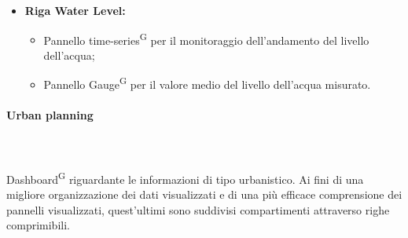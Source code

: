 \documentclass[8pt]{article}
\newcommand{\glossterm}[1]{#1\textsuperscript{G}} %
\newcommand{\subsubsubsection}[1]{\paragraph{#1}\mbox{}\\\\}
\begin{document}
\begin{itemize}
\begin{itemize}
        \item Pannello \glossterm{time-series} per il monitoraggio dell'andamento della quantità di PM10 nell'aria;
        \item Pannello \glossterm{time-series} per il monitoraggio dell'andamento della quantità di O3 nell'aria;
        \item Pannello \glossterm{time-series} per il monitoraggio dell'andamento della quantità di NO2 nell'aria;
        \item Pannello \glossterm{Gauge} per il valore medio di PM2.5 misurato;
        \item Pannello \glossterm{Gauge} per il valore medio di PM10 misurato;
        \item Pannello \glossterm{Gauge} per il valore medio di O3 misurato;
        \item Pannello \glossterm{Gauge} per il valore medio di NO2 misurato.
    \end{itemize}
    \item \textbf{Riga Water Level:}
    \begin{itemize}
        \item Pannello \glossterm{time-series} per il monitoraggio dell'andamento del livello dell'acqua;
        \item Pannello \glossterm{Gauge} per il valore medio del livello dell'acqua misurato. 
    \end{itemize}
\end{itemize}
\subsubsubsection{Urban planning} 
\glossterm{Dashboard} riguardante le informazioni di tipo urbanistico.
Ai fini di una migliore organizzazione dei dati visualizzati e di una più efficace comprensione dei pannelli visualizzati, quest'ultimi sono suddivisi compartimenti attraverso righe comprimibili.
\end{document}
